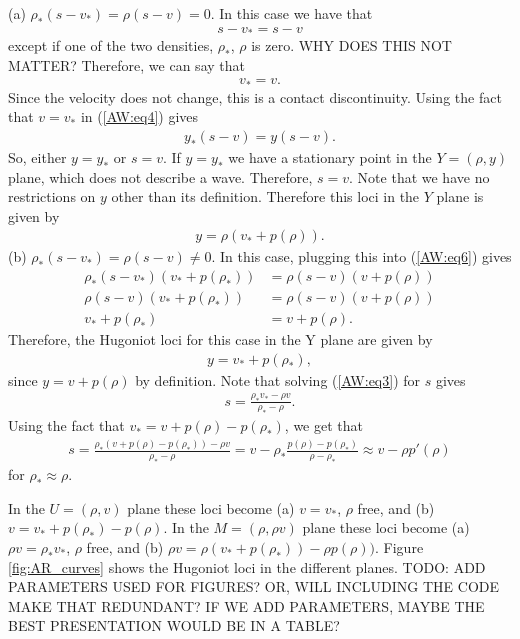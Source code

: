 \documentclass{article}
\begin{document}
(a) $\rho_*(s - v_*) = \rho (s - v) = 0$. In this case we have that
\begin{align*}
s - v_* = s - v 
\end{align*}
except if one of the two densities, $\rho_*$, $\rho$ is zero. WHY DOES THIS NOT MATTER? Therefore, we can say that
\begin{align*}
v_* = v.
\end{align*}
Since the velocity does not change, this is a contact discontinuity. Using the fact that $v = v_*$ in (\ref{AW:eq4}) gives
\begin{align*}
y_*(s - v) = y(s - v).
\end{align*}
So, either $y = y_*$ or $s = v$. If $y = y_*$ we have a stationary point in the $Y = (\rho, y)$ plane, which does not 
describe a wave. Therefore, $s = v$. Note that we have no restrictions on $y$ other than its definition. 
Therefore this loci in the $Y$ plane is given by 
\begin{align*}
y = \rho ( v_* + p(\rho )).
\end{align*}
(b) $\rho_*(s - v_*) = \rho (s - v) \neq 0$. In this case, plugging this into (\ref{AW:eq6}) gives
\begin{align*}
\rho_*(s - v_*)\left(v_* + p(\rho_* )\right) &= \rho(s - v)\left(v + p(\rho )\right)\\
\rho(s - v)\left(v_* + p(\rho_* )\right) &= \rho(s - v)\left(v + p(\rho )\right)\\
v_* + p(\rho_* )&= v + p(\rho ).
\end{align*}
Therefore, the Hugoniot loci for this case in the Y plane are given by
\begin{align*}
y = v_* + p(\rho_* ),
\end{align*}
since $y = v + p(\rho )$ by definition. Note that solving (\ref{AW:eq3}) for $s$ gives
\begin{align*}
s = \frac{\rho_*v_* - \rho v}{\rho_* - \rho}.
\end{align*}
Using the fact that $v_* = v + p(\rho) - p(\rho_*)$, we get that
\begin{align*}
s = \frac{\rho_*\left( v + p(\rho) - p(\rho_*)\right)- \rho v}{\rho_* - \rho}
= v - \rho_*\frac{p(\rho ) - p(\rho_*)}{\rho - \rho_*}
\approx v - \rho p'(\rho)
\end{align*}
for $\rho_* \approx \rho$. 

In the $U = (\rho, v)$ plane these loci become (a) $v = v_*$, $\rho$ free, and (b) $v = v_* + p(\rho_* ) - p(\rho )$.
 In the $M = (\rho, \rho v)$ plane these loci become (a) $\rho v = \rho_* v_*$, $\rho$ free, 
 and (b) $\rho v = \rho \left( v_* + p(\rho_*)\right) - \rho p(\rho))$. Figure \ref{fig:AR_curves} shows the Hugoniot loci 
 in the different planes. TODO: ADD PARAMETERS USED FOR FIGURES? OR, WILL INCLUDING THE CODE MAKE THAT REDUNDANT? 
 IF WE ADD PARAMETERS, MAYBE THE BEST PRESENTATION WOULD BE IN A TABLE?
\end{document}
